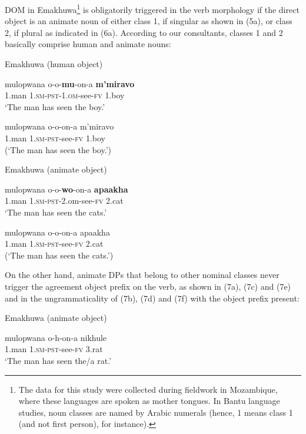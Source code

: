 \documentclass[output=paper]{langsci/langscibook}
\begin{document}
DOM in Emakhuwa\footnote{ {The data for this study were collected during fieldwork in Mozambique, where these languages are spoken as mother tongues. In Bantu language studies, noun classes are named by Arabic numerals (hence, 1 means class 1 (and not first person), for instance).}} is obligatorily triggered in the verb morphology if the direct object is an animate noun of either class 1, if singular as shown in (5a), or class 2, if plural as indicated in (6a). According to our consultants, classes 1 and 2 basically comprise human and animate nouns:

{Emakhuwa (human object)}

\ea
\gll mulopwana            o-o-\textbf{mu}{}-on-a                    \textbf{m’miravo}\\
     1.man                    1.{\textsc{sm}}\textsc{{}-}{\textsc{pst}}\textsc{{}-1.}{\textsc{om}}{}-see-{\textsc{fv}}     1.boy\\
\glt ‘The man has seen the boy.’
\z


\ea
\gll *mulopwana          o-o-on-a                          m’miravo\\
     1.man                    1.{\textsc{sm}}\textsc{{}-}{\textsc{pst}}{}-see-{\textsc{fv}}              1.boy\\
\glt (‘The man has seen the boy.’)
\z


{Emakhuwa (animate object)}

\ea
\gll mulopwana           o-o-\textbf{wo}{}-on-a                    \textbf{apaakha}\\
     {1.man                   1.}{\textsc{sm-pst}}{{}-2.om-see-}{\textsc{fv}}      {2.cat}\\
\glt  ‘The man has seen the cats.’
\z


\ea
\gll *mulopwana         o-o-on-a                         apaakha\\
     {1.man                    1}{\textsc{.sm-pst}}{{}-see-}{\textsc{fv}}             {2.cat}\\
\glt (‘The man has seen the cats.’)
\z

On the other hand, animate DPs that belong to other nominal classes never trigger the agreement object prefix on the verb, as shown in (7a), (7c) and (7e) and in the ungrammaticality of (7b), (7d) and (7f) with the object prefix  present:

{Emakhuwa (animate object)}

\ea
\gll mulopwana          o-h-on-a                       nikhule\\
     {1.man                  }{\textsc{1.sm-pst}}{{}-see-}{\textsc{fv}}            {3.rat}\\
\glt ‘The man has seen the/a rat.’
\z
\end{document}
